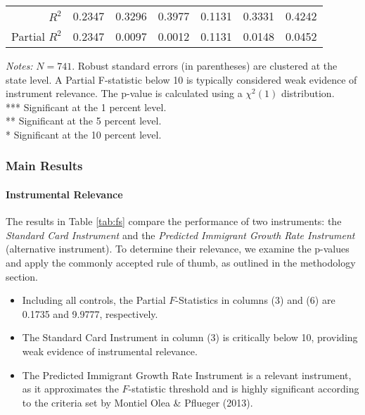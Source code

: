 \begin{frame}
\begin{table}[ht]
{\begin{tabular}{rcccccc}
                \cmidrule(lr){1-1} \cmidrule(lr){2-4} \cmidrule(lr){5-7} 
                $R^2$                                                         & 0.2347          & 0.3296          & 0.3977          & 0.1131         & 0.3331          & 0.4242          \\
                Partial $R^2$                                                 & 0.2347          & 0.0097          & 0.0012          & 0.1131         & 0.0148          & 0.0452          \\
                \bottomrule
            \end{tabular}
        }
        \vspace{0.2cm}
        
        \begin{minipage}{\linewidth}
            \tiny
            \textit{Notes:} $N = 741$. Robust standard errors (in parentheses) are clustered at the state level. A Partial F-statistic below 10 is typically considered weak evidence of instrument relevance. The p-value is calculated using a $\chi^2(1)$ distribution. \\
            *** Significant at the 1 percent level. \\
            ** Significant at the 5 percent level. \\
            * Significant at the 10 percent level.
        \end{minipage}
    \end{table}

\end{frame}
\begin{frame}
    \frametitle{Main Results}
    \framesubtitle{Instrumental Relevance}
    
    The results in Table \ref{tab:fs} compare the performance of two instruments: the \textit{Standard Card Instrument} and the \textit{Predicted Immigrant Growth Rate Instrument} (alternative instrument). To determine their relevance, we examine the p-values and apply the commonly accepted rule of thumb, as outlined in the methodology section.
    
    \begin{itemize}
        \item Including all controls, the Partial $F$-Statistics in columns (3) and (6) are 0.1735 and 9.9777, respectively. 
        \item The Standard Card Instrument in column (3) is critically below 10, providing weak evidence of instrumental relevance.
        \item The Predicted Immigrant Growth Rate Instrument is a relevant instrument, as it approximates the $F$-statistic threshold and is highly significant according to the criteria set by Montiel Olea \& Pflueger (2013).
    \end{itemize}

\end{frame}

